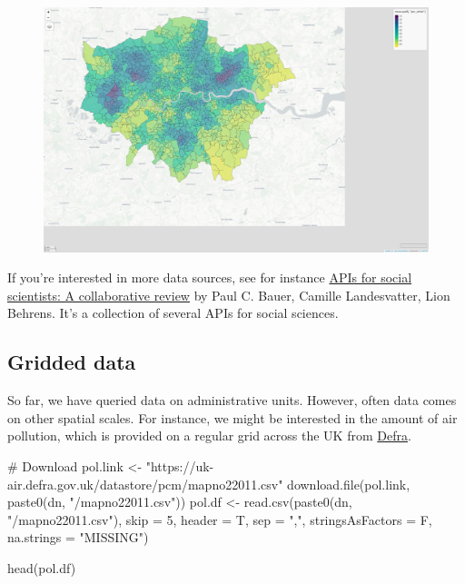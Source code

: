 \documentclass[
  letterpaper,
  DIV=11,
  numbers=noendperiod]{scrreprt}
\newenvironment{Shaded}{\begin{snugshade}}{\end{snugshade}}
\newcommand{\AttributeTok}[1]{\textcolor[rgb]{0.40,0.45,0.13}{#1}}
\newcommand{\CommentTok}[1]{\textcolor[rgb]{0.37,0.37,0.37}{#1}}
\newcommand{\DecValTok}[1]{\textcolor[rgb]{0.68,0.00,0.00}{#1}}
\newcommand{\FunctionTok}[1]{\textcolor[rgb]{0.28,0.35,0.67}{#1}}
\newcommand{\NormalTok}[1]{\textcolor[rgb]{0.00,0.23,0.31}{#1}}
\newcommand{\OtherTok}[1]{\textcolor[rgb]{0.00,0.23,0.31}{#1}}
\newcommand{\StringTok}[1]{\textcolor[rgb]{0.13,0.47,0.30}{#1}}
\begin{document}
\begin{figure}[H]

{\centering \includegraphics{01_refresher_short_files/figure-pdf/unnamed-chunk-12-1.pdf}

}

\end{figure}

If you're interested in more data sources, see for instance
\href{https://bookdown.org/paul/apis_for_social_scientists/}{APIs for
social scientists: A collaborative review} by Paul C. Bauer, Camille
Landesvatter, Lion Behrens. It's a collection of several APIs for social
sciences.

\hypertarget{gridded-data}{%
\subsection{Gridded data}\label{gridded-data}}

So far, we have queried data on administrative units. However, often
data comes on other spatial scales. For instance, we might be interested
in the amount of air pollution, which is provided on a regular grid
across the UK from
\href{https://uk-air.defra.gov.uk/data/pcm-data}{Defra}.

\begin{Shaded}
\begin{Highlighting}[]
\CommentTok{\# Download}
\NormalTok{pol.link }\OtherTok{\textless{}{-}} \StringTok{"https://uk{-}air.defra.gov.uk/datastore/pcm/mapno22011.csv"}
\FunctionTok{download.file}\NormalTok{(pol.link, }\FunctionTok{paste0}\NormalTok{(dn, }\StringTok{"/mapno22011.csv"}\NormalTok{))}
\NormalTok{pol.df }\OtherTok{\textless{}{-}} \FunctionTok{read.csv}\NormalTok{(}\FunctionTok{paste0}\NormalTok{(dn, }\StringTok{"/mapno22011.csv"}\NormalTok{), }\AttributeTok{skip =} \DecValTok{5}\NormalTok{, }\AttributeTok{header =}\NormalTok{ T, }\AttributeTok{sep =} \StringTok{","}\NormalTok{,}
                      \AttributeTok{stringsAsFactors =}\NormalTok{ F, }\AttributeTok{na.strings =} \StringTok{"MISSING"}\NormalTok{)}

\FunctionTok{head}\NormalTok{(pol.df)}
\end{Highlighting}
\end{Shaded}
\end{document}
